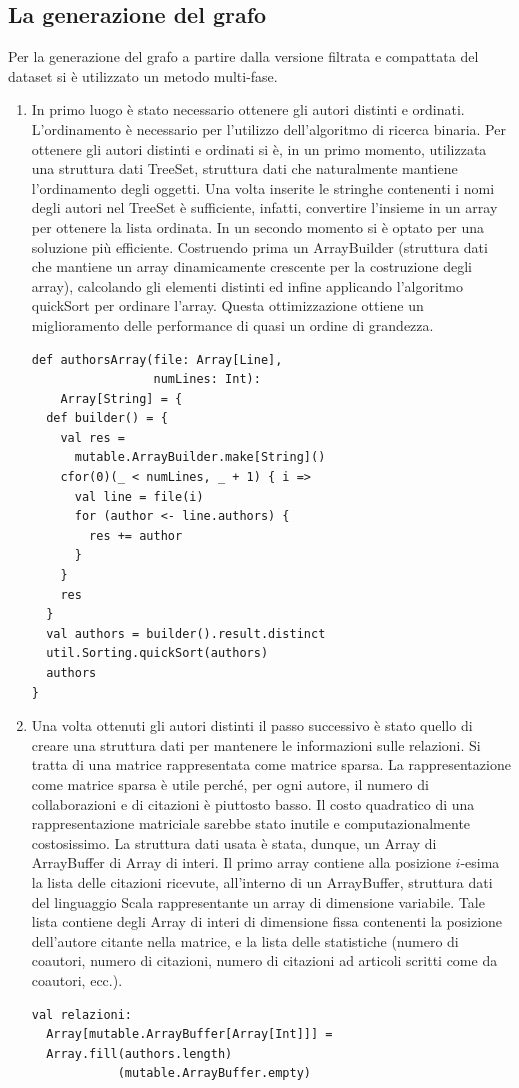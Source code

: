 \documentclass[a4paper, 12pt]{article}
\begin{document}
\subsection{La generazione del grafo}
Per la generazione del grafo a partire dalla versione filtrata e compattata del dataset si è utilizzato un metodo multi-fase.
\begin{enumerate}
  \item In primo luogo è stato necessario ottenere gli autori distinti e ordinati. L'ordinamento è necessario per l'utilizzo dell'algoritmo di ricerca binaria. Per ottenere gli autori distinti e ordinati si è, in un primo momento, utilizzata una struttura dati TreeSet, struttura dati che naturalmente mantiene l'ordinamento degli oggetti. Una volta inserite le stringhe contenenti i nomi degli autori nel TreeSet è sufficiente, infatti, convertire l'insieme in un array per ottenere la lista ordinata. In un secondo momento si è optato per una soluzione più efficiente. Costruendo prima un ArrayBuilder (struttura dati che mantiene un array dinamicamente crescente per la costruzione degli array), calcolando gli elementi distinti ed infine applicando l'algoritmo quickSort per ordinare l'array. Questa ottimizzazione ottiene un miglioramento delle performance di quasi un ordine di grandezza.
  \begin{lstlisting}[keepspaces=true]
def authorsArray(file: Array[Line],
                 numLines: Int):
    Array[String] = {
  def builder() = {
    val res =
      mutable.ArrayBuilder.make[String]()
    cfor(0)(_ < numLines, _ + 1) { i =>
      val line = file(i)
      for (author <- line.authors) {
        res += author
      }
    }
    res
  }
  val authors = builder().result.distinct
  util.Sorting.quickSort(authors)
  authors
}    
  \end{lstlisting}
  \item Una volta ottenuti gli autori distinti il passo successivo è stato quello di creare una struttura dati per mantenere le informazioni sulle relazioni. Si tratta di una matrice rappresentata come matrice sparsa. La rappresentazione come matrice sparsa è utile perché, per ogni autore, il numero di collaborazioni e di citazioni è piuttosto basso. Il costo quadratico di una rappresentazione matriciale sarebbe stato inutile e computazionalmente costosissimo. La struttura dati usata è stata, dunque, un Array di ArrayBuffer di Array di interi. Il primo array contiene alla posizione $i$-esima la lista delle citazioni ricevute, all'interno di un ArrayBuffer, struttura dati del linguaggio Scala rappresentante un array di dimensione variabile. Tale lista contiene degli Array di interi di dimensione fissa contenenti la posizione dell'autore citante nella matrice, e la lista delle statistiche (numero di coautori, numero di citazioni, numero di citazioni ad articoli scritti come da coautori, ecc.).
  \begin{lstlisting}[keepspaces=true]
val relazioni: 
  Array[mutable.ArrayBuffer[Array[Int]]] = 
  Array.fill(authors.length)
            (mutable.ArrayBuffer.empty)


\end{lstlisting}
\end{enumerate}
\end{document}
